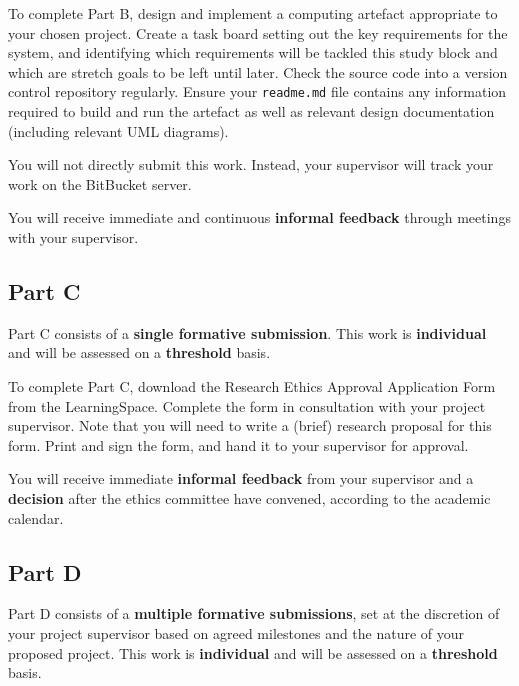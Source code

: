 To complete Part B, design and implement a computing artefact appropriate to your chosen project.
Create a task board setting out the key requirements for the system,
and identifying which requirements will be tackled this study block
and which are stretch goals to be left until later.
Check the source code into a version control repository regularly.
Ensure your \texttt{readme.md} file contains any information required to build and run the artefact as well as
relevant design documentation (including relevant UML diagrams).

You will not directly submit this work. Instead, your supervisor will track your work on the BitBucket server.

You will receive immediate and continuous \textbf{informal feedback} through meetings with your supervisor.


\subsection*{Part C}

Part C consists of a \textbf{single formative submission}.
This work is \textbf{individual} and will be assessed on a \textbf{threshold} basis.

To complete Part C, download the Research Ethics Approval Application Form
from the LearningSpace. Complete the form in consultation with your project supervisor.
Note that you will need to write a (brief) research proposal for this form. Print and sign the form, 
and hand it to your supervisor for approval.

You will receive immediate \textbf{informal feedback} from your supervisor and a \textbf{decision} 
after the ethics committee have convened, according to the academic calendar.

\subsection*{Part D}

Part D consists of a \textbf{multiple formative submissions},
set at the discretion of your project supervisor based on agreed milestones and the nature of your proposed project.
This work is \textbf{individual} and will be assessed on a \textbf{threshold} basis.

